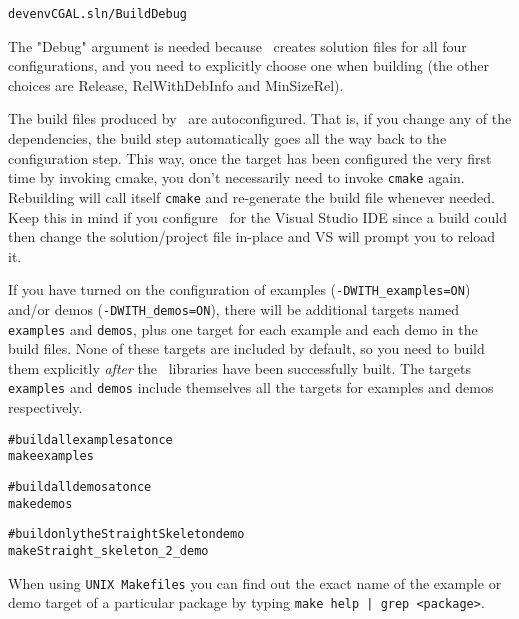 {\ccTexHtml{}{}
\begin{alltt}

    devenv CGAL.sln /Build Debug

\end{alltt}
}

The "Debug" argument is needed because \cmake\ creates solution files for
all four configurations, and you need to explicitly choose one when building
(the other choices are Release, RelWithDebInfo and MinSizeRel).


\begin{ccAdvanced}
The build files produced by \cmake\ are autoconfigured. That is, if you change any 
of the dependencies, the build step automatically goes all the way back to
the configuration step. This way, once the target has been configured the
very first time by
invoking cmake, you don't necessarily need to invoke \texttt{cmake} again. Rebuilding will call
itself \texttt{cmake} and re-generate the build file whenever needed. Keep this in mind if you
configure \cgal\ for the Visual Studio IDE since a build could then change the solution/project 
file in-place and VS will prompt you to reload it.
\end{ccAdvanced}


If you have turned on the configuration of examples
(\texttt{-DWITH\_examples=ON}) and/or demos (\texttt{-DWITH\_demos=ON}), there will be additional
targets named \texttt{examples} and \texttt{demos}, plus one target for
each example and each demo in the build files.
None of these targets are included by default, so you need to build them explicitly
\emph{after} the \cgal\ libraries have been successfully built.
The targets \texttt{examples} and \texttt{demos} include themselves all the targets
for examples and demos respectively.

{
\ccTexHtml{}{}
\begin{alltt}

# build all examples at once
make examples 

# build all demos at once
make demos

# build only the Straight Skeleton demo
make Straight_skeleton_2_demo

\end{alltt}
}

\begin{ccAdvanced}
When using \texttt{UNIX Makefiles} you can find out the exact name of the example or demo target
of a particular package by typing \texttt{make help | grep <package>}.
\end{ccAdvanced}

